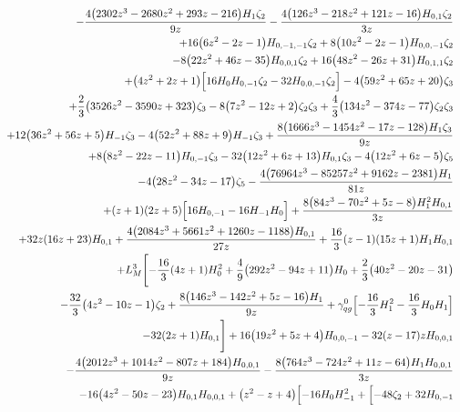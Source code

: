 \begin{eqnarray}
\nonumber \\ &&
-\frac{4 \big(2302 z^3-2680 z^2+293  z-216\big) H_1 \zeta_2}{9 z}-\frac{4 \big(126 z^3-218 z^2+121 z-16\big)  H_{0,1} \zeta_2}{3 z}
\nonumber \\ &&
+16  \big(6 z^2-2 z-1\big) H_{0,-1,-1}\zeta_2+8  \big(10 z^2-2 z-1\big) H_{0,0,-1} \zeta_2
\nonumber \\ &&
-8 \big(22z^2+46 z-35\big) H_{0,0,1} \zeta_2+16 \big(48 z^2-26 z+31\big) H_{0,1,1}\zeta_2
\nonumber \\ &&
+\big(4 z^2+2 z+1\big) \Bigl[16 H_0 H_{0,-1} \zeta_2-32H_{0,0,-1} \zeta_2\Bigr]-4  \big(59 z^2+65 z+20\big) \zeta_3
\nonumber \\ &&
+\frac{2}{3} \big(3526 z^2-3590 z+323\big) \zeta_3-8  \big(7z^2-12 z+2\big) \zeta_2 \zeta_3
+\frac{4}{3} \big(134 z^2-374z-77\big) \zeta_2 \zeta_3
\nonumber \\ &&
+12 \big(36 z^2+56 z+5\big) H_{-1}\zeta_3
-4  \big(52 z^2+88 z+9\big) H_{-1} \zeta_3+\frac{8  \big(1666 z^3-1454 z^2-17 z-128\big) H_1 \zeta_3}{9 z}
\nonumber \\ &&
+8 \big(8 z^2-22z-11\big) H_{0,-1} \zeta_3-32 \big(12 z^2+6 z+13\big) H_{0,1} \zeta_3-4  \big(12 z^2+6 z-5\big) \zeta_5
\nonumber \\ &&
-4 \big(28 z^2-34 z-17\big)\zeta_5-\frac{4 \big(76964 z^3-85257 z^2+9162 z-2381\big) H_1}{81  z}
\nonumber \\ &&
+(z+1) (2 z+5) \Bigl[16 H_{0,-1}-16 H_{-1} H_0\Bigr]+\frac{8 \big(84 z^3-70  z^2+5 z-8\big) H_1^2 H_{0,1}}{3 z}
\nonumber \\ &&
+32  z (16 z+23) H_{0,1}+\frac{4  \big(2084 z^3+5661 z^2+1260 z-1188\big) H_{0,1}}{27 z}+\frac{16}{3} (z-1)(15 z+1) H_1 H_{0,1}
\nonumber \\ &&
+L_M^3 \Biggl[-\frac{16}{3} (4 z+1) H_0^2+\frac{4}{9}\big(292 z^2-94 z+11\big) H_0+\frac{2}{3} \big(40 z^2-20z-31\big)
\nonumber \\ &&
-\frac{32}{3} \big(4 z^2-10 z-1\big) \zeta_2+\frac{8 \big(146  z^3-142 z^2+5 z-16\big) H_1}{9 z}+{\gamma}_{qg}^{0} \Bigl[-\frac{16}{3}H_1^2-\frac{16}{3} H_0 H_1\Bigr]
\nonumber \\ &&
-32 (2 z+1) H_{0,1}\Biggr]+16 \big(19 z^2+5 z+4\big) H_{0,0,-1}-32  (z-17)z H_{0,0,1}
\nonumber \\ &&
-\frac{4 \big(2012 z^3+1014  z^2-807 z+184\big) H_{0,0,1}}{9 z}-\frac{8 \big(764 z^3-724 z^2+11 z-64\big)  H_1 H_{0,0,1}}{3 z}
\nonumber \\ &&
-16 \big(4 z^2-50 z-23\big) H_{0,1}H_{0,0,1}+\big(z^2-z+4\big) \Bigl[-16 H_0 H_{-1}^2+\Bigl[-48 \zeta_2+32H_{0,-1}

\end{eqnarray}
